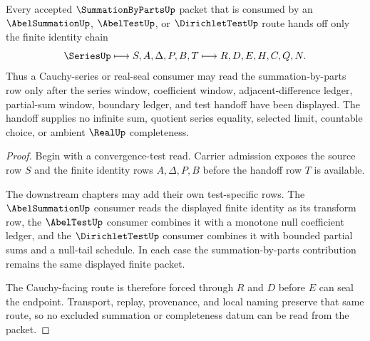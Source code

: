 \begin{theorem}
\label{thm:summation-by-parts-cauchy-series-handoff}
Every accepted $\SummationByPartsUp$ packet that is consumed by an $\AbelSummationUp$, $\AbelTestUp$, or $\DirichletTestUp$ route hands off only the finite identity chain
$$
\SeriesUp \longmapsto S,A,\Delta,P,B,T \longmapsto R,D,E,H,C,Q,N .
$$
Thus a Cauchy-series or real-seal consumer may read the summation-by-parts row only after the series window, coefficient window, adjacent-difference ledger, partial-sum window, boundary ledger, and test handoff have been displayed. The handoff supplies no infinite sum, quotient series equality, selected limit, countable choice, or ambient $\RealUp$ completeness.
\end{theorem}
\begin{proof}
Begin with a convergence-test read. Carrier admission exposes the source row $S$ and the finite identity rows $A,\Delta,P,B$ before the handoff row $T$ is available.

The downstream chapters may add their own test-specific rows. The $\AbelSummationUp$ consumer reads the displayed finite identity as its transform row, the $\AbelTestUp$ consumer combines it with a monotone null coefficient ledger, and the $\DirichletTestUp$ consumer combines it with bounded partial sums and a null-tail schedule. In each case the summation-by-parts contribution remains the same displayed finite packet.

The Cauchy-facing route is therefore forced through $R$ and $D$ before $E$ can seal the endpoint. Transport, replay, provenance, and local naming preserve that same route, so no excluded summation or completeness datum can be read from the packet.
\end{proof}



